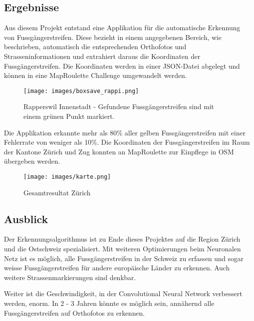 \subsection*{Ergebnisse}
Aus diesem Projekt entstand eine Applikation für die automatische Erkennung von Fussgängerstreifen. Diese bezieht in einem angegebenen Bereich, wie beschrieben, automatisch die entsprechenden Orthofotos und Strasseninformationen und extrahiert daraus die Koordinaten der Fussgängerstreifen. Die Koordinaten werden in einer JSON-Datei abgelegt und können in eine MapRoulette Challenge umgewandelt werden. 
\\
\begin{figure}[H]
	\centering
	\texttt{[image: images/boxsave\_rappi.png]}
	\caption[Überblick]{Rapperswil Innenstadt - Gefundene Fussgängerstreifen sind mit einem grünen Punkt markiert.}
\end{figure}
\medskip
Die Applikation erkannte mehr als 80\% aller gelben Fussgängerstreifen mit einer Fehlerrate von weniger als 10\%. Die Koordinaten der Fussgängerstreifen im Raum der Kantone Zürich und Zug konnten an MapRoulette zur Einpflege in OSM übergeben werden.
\\
\begin{figure}[H]
	\centering
	\texttt{[image: images/karte.png]}
	\caption{Gesamtresultat Zürich}
\end{figure}

\subsection*{Ausblick}
Der Erkennungsalgorithmus ist zu Ende dieses Projektes auf die Region Zürich und die Ostschweiz spezialisiert. Mit weiteren Optimierungen beim Neuronalen Netz ist es möglich, alle Fussgängerstreifen in der Schweiz zu erfassen und sogar weisse Fussgängerstreifen für andere europäische Länder zu erkennen. Auch weitere Strassenmarkierungen sind denkbar.

Weiter ist die Geschwindigkeit, in der Convolutional Neural Network verbessert werden, enorm. In 2 - 3 Jahren könnte es möglich sein, annähernd alle Fussgängerstreifen auf Orthofotos zu erkennen.
\newpage
